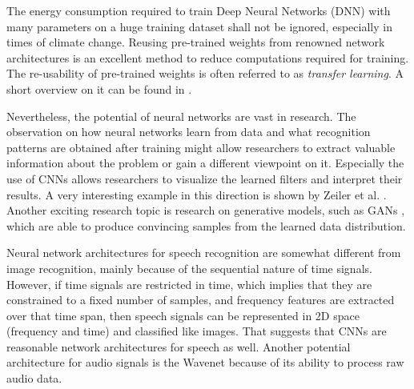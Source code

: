 The energy consumption required to train Deep Neural Networks (DNN) with many parameters on a huge training dataset shall not be ignored, especially in times of climate change.
Reusing pre-trained weights from renowned network architectures is an excellent method to reduce computations required for training.
The re-usability of pre-trained weights is often referred to as \emph{transfer learning}.
A short overview on it can be found in \cite{TransferLearning}.

Nevertheless, the potential of neural networks are vast in research.
The observation on how neural networks learn from data and what recognition patterns are obtained after training might allow researchers to extract valuable information about the problem or gain a different viewpoint on it.
Especially the use of CNNs allows researchers to visualize the learned filters and interpret their results.
A very interesting example in this direction is shown by Zeiler et al. \cite{Zeiler2013VisCNN}.
Another exciting research topic is research on generative models, such as GANs \cite{Goodfellow2014GANs}, which are able to produce convincing samples from the learned data distribution.

Neural network architectures for speech recognition are somewhat different from image recognition, mainly because of the sequential nature of time signals.
However, if time signals are restricted in time, which implies that they are constrained to a fixed number of samples, and frequency features are extracted over that time span, then speech signals can be represented in 2D space (frequency and time) and classified like images.
That suggests that CNNs are reasonable network architectures for speech as well.
Another potential architecture for audio signals is the Wavenet \cite{Oord2016Wavenet} because of its ability to process raw audio data.